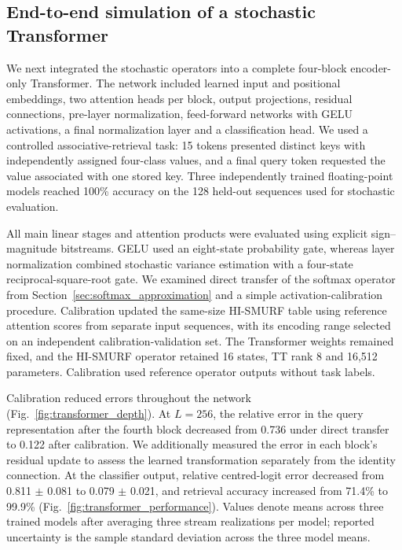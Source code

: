 \subsection{End-to-end simulation of a stochastic Transformer}
\label{sec:full_transformer}

We next integrated the stochastic operators into a complete four-block
encoder-only Transformer. The network included learned input and positional
embeddings, two attention heads per block, output projections, residual
connections, pre-layer normalization, feed-forward networks with GELU
activations, a final normalization layer and a classification head. We used
a controlled associative-retrieval task: 15 tokens presented distinct keys
with independently assigned four-class values, and a final query token
requested the value associated with one stored key. Three independently
trained floating-point models reached 100\% accuracy on the 128 held-out
sequences used for stochastic evaluation.

All main linear stages and attention products were evaluated using explicit
sign--magnitude bitstreams. GELU used an eight-state probability gate, whereas
layer normalization combined stochastic variance estimation with a four-state
reciprocal-square-root gate. We examined direct transfer of the softmax
operator from Section~\ref{sec:softmax_approximation} and a simple
activation-calibration procedure. Calibration updated the same-size
HI-SMURF table using reference attention scores from separate input sequences,
with its encoding range selected on an independent calibration-validation set.
The Transformer weights remained fixed, and the HI-SMURF operator retained
16 states, TT rank 8 and 16,512 parameters. Calibration used reference
operator outputs without task labels.

Calibration reduced errors throughout the network
(Fig.~\ref{fig:transformer_depth}). At $L=256$, the relative error in the
query representation after the fourth block decreased from 0.736
under direct transfer to 0.122 after calibration. We additionally
measured the error in each block's residual update to assess the learned
transformation separately from the identity connection. At the classifier
output, relative centred-logit error decreased from
0.811 $\pm$ 0.081 to 0.079 $\pm$ 0.021,
and retrieval accuracy increased from 71.4\% to 99.9\%
(Fig.~\ref{fig:transformer_performance}). Values denote means across three
trained models after averaging three stream realizations per model; reported
uncertainty is the sample standard deviation across the three model means.

